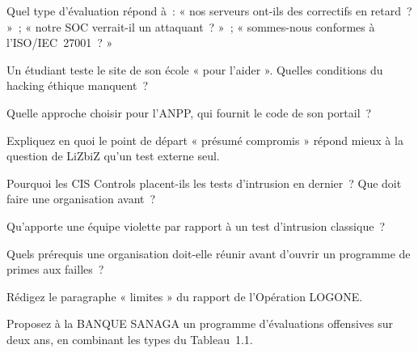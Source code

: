 \bigskip

\begin{boxexo}[title={\ding{45}\quad Exercice~1.1. Quel type~? \niveaubase}]
Quel type d'évaluation répond à~: « nos serveurs ont-ils des correctifs en
retard~? »~; « notre SOC verrait-il un attaquant~? »~; « sommes-nous
conformes à l'ISO/IEC~27001~? »
\end{boxexo}

\begin{boxexo}[title={\ding{45}\quad Exercice~1.2. Les trois conditions \niveaubase}]
Un étudiant teste le site de son école « pour l'aider ». Quelles conditions
du hacking éthique manquent~?
\end{boxexo}

\begin{boxexo}[title={\ding{45}\quad Exercice~1.3. Approche \niveaubase}]
Quelle approche choisir pour l'ANPP, qui fournit le code de son portail~?
\end{boxexo}

\begin{boxexo}[title={\ding{45}\quad Exercice~1.4. Intrusion présumée \niveaumoyen}]
Expliquez en quoi le point de départ « présumé compromis » répond mieux à la
question de LiZbiZ qu'un test externe seul.
\end{boxexo}

\begin{boxexo}[title={\ding{45}\quad Exercice~1.5. Contrôle 18 \niveaumoyen}]
Pourquoi les CIS Controls placent-ils les tests d'intrusion en dernier~?
Que doit faire une organisation avant~?
\end{boxexo}

\begin{boxexo}[title={\ding{45}\quad Exercice~1.6. Violette \niveaumoyen}]
Qu'apporte une équipe violette par rapport à un test d'intrusion classique~?
\end{boxexo}

\begin{boxexo}[title={\ding{45}\quad Exercice~1.7. Primes \niveaumoyen}]
Quels prérequis une organisation doit-elle réunir avant d'ouvrir un
programme de primes aux failles~?
\end{boxexo}

\begin{boxexo}[title={\ding{45}\quad Exercice~1.8. Limites \niveaumoyen}]
Rédigez le paragraphe « limites » du rapport de l'Opération LOGONE.
\end{boxexo}

\begin{boxexo}[title={\ding{45}\quad Exercice~1.9. Un programme \niveauexpert}]
Proposez à la BANQUE SANAGA un programme d'évaluations offensives sur deux
ans, en combinant les types du Tableau~1.1.
\end{boxexo}

